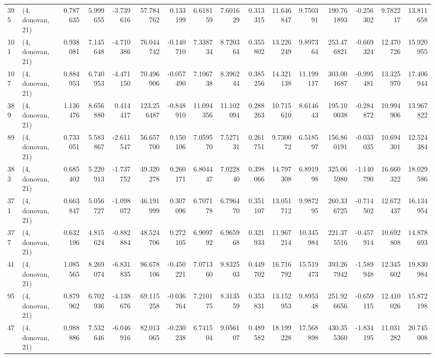 \begin{tabular}{llrrrrrrrrrrrrrr}
395 &  (4, donovan, 21) &   0.787635 &   5.999655 &  -3.739616 &    57.784762 &   0.133199 &   6.618159 &   7.601629 &  0.313315 &  11.646847 &   9.750391 &   190.761893 & -0.256302 &   9.782217 &  13.811658 \\
101 &  (4, donovan, 21) &   0.938081 &   7.145648 &  -4.710386 &    76.044742 &  -0.140710 &   7.338734 &   8.720364 &  0.355802 &  13.226249 &   9.897364 &   253.476821 & -0.669324 &  12.470726 &  15.920955 \\
107 &  (4, donovan, 21) &   0.884953 &   6.740953 &  -4.471150 &    70.496906 &  -0.057490 &   7.106738 &   8.396244 &  0.385256 &  14.321138 &  11.199117 &   303.001687 & -0.995481 &  13.325970 &  17.406944 \\
389 &  (4, donovan, 21) &   1.136476 &   8.656880 &   0.414417 &   123.256487 &  -0.848910 &  11.094356 &  11.102094 &  0.288263 &  10.715610 &   8.614643 &   195.100038 & -0.284872 &  10.994906 &  13.967822 \\
89  &  (4, donovan, 21) &   0.733051 &   5.583867 &  -2.611547 &    56.657700 &   0.150106 &   7.059570 &   7.527131 &  0.261751 &   9.730072 &   6.518597 &   156.860191 & -0.033035 &  10.694301 &  12.524384 \\
383 &  (4, donovan, 21) &   0.685402 &   5.220913 &  -1.737752 &    49.320278 &   0.260171 &   6.804447 &   7.022840 &  0.398066 &  14.797308 &   6.891998 &   325.065980 & -1.140790 &  16.660322 &  18.029586 \\
371 &  (4, donovan, 21) &   0.663847 &   5.056727 &  -1.098072 &    46.191999 &   0.307096 &   6.707178 &   6.796470 &  0.351107 &  13.051712 &   9.987295 &   260.336725 & -0.714502 &  12.672437 &  16.134954 \\
377 &  (4, donovan, 21) &   0.632196 &   4.815624 &  -0.882884 &    48.524706 &   0.272105 &   6.909792 &   6.965968 &  0.321933 &  11.967214 &  10.345984 &   221.375516 & -0.457914 &  10.692808 &  14.878693 \\
41  &  (4, donovan, 21) &   1.085565 &   8.269074 &  -6.831835 &    96.678106 &  -0.450221 &   7.071360 &   9.832503 &  0.449702 &  16.716792 &  15.519473 &   393.267942 & -1.589948 &  12.345602 &  19.830984 \\
95  &  (4, donovan, 21) &   0.879962 &   6.702936 &  -4.138676 &    69.115258 &  -0.036764 &   7.210175 &   8.313559 &  0.353831 &  13.152953 &   9.895348 &   251.926656 & -0.659115 &  12.410026 &  15.872198 \\
47  &  (4, donovan, 21) &   0.988886 &   7.532646 &  -6.046916 &    82.013065 &  -0.230238 &   6.741504 &   9.056107 &  0.489582 &  18.199228 &  17.568898 &   430.355360 & -1.834195 &  11.031282 &  20.745008 \\

\end{tabular}
